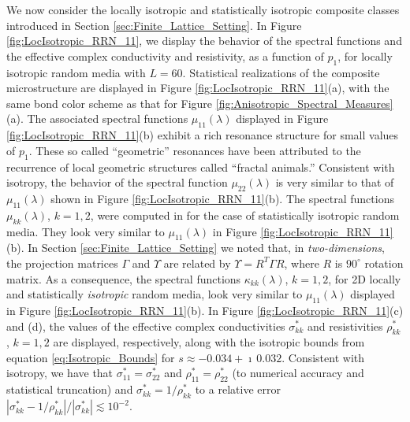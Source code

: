 \documentclass{cmslatex}
\begin{document}
We now consider the locally isotropic and statistically isotropic
composite classes introduced in Section
\ref{sec:Finite_Lattice_Setting}.
In Figure
\ref{fig:LocIsotropic_RRN_11}, we display the behavior of the 
spectral functions and the effective complex conductivity and
resistivity, as a function of $p_1$, for locally isotropic random
media with $L=60$. Statistical realizations of the composite microstructure
are displayed in Figure \ref{fig:LocIsotropic_RRN_11}(a), with the
same bond color scheme as that for Figure
\ref{fig:Anisotropic_Spectral_Measures}(a). The
associated spectral functions $\mu_{11}(\lambda)$ displayed in Figure
\ref{fig:LocIsotropic_RRN_11}(b) exhibit a rich 
resonance structure for small values of $p_1$. These so called
``geometric'' resonances have been attributed
\cite{Jonckheere_Luck_JPA_1998} to the recurrence of 
local geometric structures called ``fractal animals.''  Consistent
with isotropy, the behavior of the spectral function $\mu_{22}(\lambda)$ is
very similar to that of $\mu_{11}(\lambda)$ shown in Figure
\ref{fig:LocIsotropic_RRN_11}(b). The spectral functions $\mu_{kk}(\lambda)$,
$k=1,2$, were computed in \cite{Murphy:JMP:063506} for the case of
statistically isotropic random media. They look very similar to
$\mu_{11}(\lambda)$ in Figure \ref{fig:LocIsotropic_RRN_11}(b).  In Section
\ref{sec:Finite_Lattice_Setting} we noted that, in
\emph{two-dimensions}, the projection matrices $\Gamma$ and $\Upsilon$ 
are related by $\Upsilon=R^T\Gamma R$, where $R$ is $90^\circ$ rotation
matrix. As a consequence, the spectral functions $\kappa_{kk}(\lambda)$, $k=1,2$, for
2D locally and statistically \emph{isotropic} random media, look very
similar to $\mu_{11}(\lambda)$ displayed in Figure
\ref{fig:LocIsotropic_RRN_11}(b). In Figure
\ref{fig:LocIsotropic_RRN_11}(c) and (d), the values of the 
effective complex conductivities $\sigma^*_{kk}$ and resistivities
$\rho^*_{kk}$, $k=1,2$ are displayed, respectively,
along with the isotropic bounds from equation
\eqref{eq:Isotropic_Bounds} for $s\approx-0.034+\imath\,0.032$. Consistent with
isotropy, we have that $\sigma^*_{11}=\sigma^*_{22}$ and $\rho^*_{11}=\rho^*_{22}$ (to
numerical accuracy and statistical truncation) and
$\sigma^*_{kk}=1/\rho^*_{kk}$ to a relative error
$|\sigma^*_{kk}-1/\rho^*_{kk}|/|\sigma^*_{kk}|\lesssim10^{-2}$.
\end{document}
